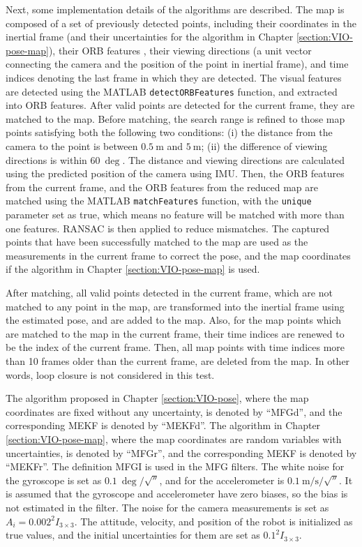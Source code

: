 Next, some implementation details of the algorithms are described.
The map is composed of a set of previously detected points, including their coordinates in the inertial frame (and their uncertainties for the algorithm in Chapter \ref{section:VIO-pose-map}), their ORB features \cite{mur2015orb}, their viewing directions (a unit vector connecting the camera and the position of the point in inertial frame), and time indices denoting the last frame in which they are detected.
The visual features are detected using the MATLAB \texttt{detectORBFeatures} function, and extracted into ORB features.
After valid points are detected for the current frame, they are matched
to the map.
Before matching, the search range is refined to those map points satisfying both the following two conditions:
(i) the distance from the camera to the point is between $\SI{0.5}{\meter}$ and $\SI{5}{\meter}$; (ii) the difference of viewing directions is within
$\SI{60}{\deg}$.
The distance and viewing directions are calculated using the predicted position of the camera using IMU.
Then, the ORB features from the current frame, and the ORB features from the reduced map are matched using the MATLAB \texttt{matchFeatures} function, with the \texttt{unique} parameter set as true, which means no feature will be matched with more than one features.
RANSAC is then applied to reduce mismatches.
The captured points that have been successfully matched to the map are used as the measurements in the current frame to correct the pose, and the map coordinates if the algorithm in Chapter \ref{section:VIO-pose-map} is used.

After matching, all valid points detected in the current frame, which are not matched to any point in the map, are transformed into the inertial frame using the estimated pose, and are added to the map.
Also, for the map points which are matched to the map in the current frame, their time indices are renewed to be the index of the current frame.
Then, all map points with time indices more than 10 frames older than the current frame, are deleted from the map.
In other words, loop closure is not considered in this test.

The algorithm proposed in Chapter \ref{section:VIO-pose}, where the map coordinates are fixed without any uncertainty, is denoted by ``MFGd'', and the corresponding MEKF is denoted by ``MEKFd''.
The algorithm in Chapter \ref{section:VIO-pose-map}, where the map coordinates are random variables with uncertainties, is denoted by ``MFGr'', and the corresponding MEKF is denoted by ``MEKFr''.
The definition MFGI is used in the MFG filters.
The white noise for the gyroscope is set as $\SI{0.1}{\deg/\sqrt{\second}}$, and for the accelerometer is $\SI{0.1}{\meter/\second/\sqrt{\second}}$.
It is assumed that the gyroscope and accelerometer have zero biases, so the bias is not estimated in the filter.
The noise for the camera measurements is set as $A_i = 0.002^2I_{3\times 3}$.
The attitude, velocity, and position of the robot is initialized as true values, and the initial uncertainties for them are set as $0.1^2I_{3\times 3}$.

